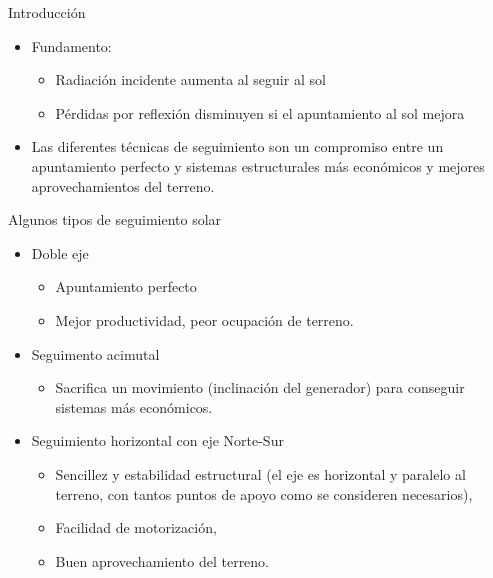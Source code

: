 \documentclass[xcolor={usenames,svgnames,dvipsnames}]{beamer}
\begin{document}
\begin{frame}[label={sec:orged8177a}]{Introducción}
\begin{itemize}[<+->]
\item \alert{Fundamento:}
\begin{itemize}[<.->]
\item Radiación incidente aumenta al seguir al sol

\item Pérdidas por reflexión disminuyen si el apuntamiento al sol mejora
\end{itemize}

\item Las diferentes técnicas de seguimiento son un compromiso entre un
apuntamiento perfecto y sistemas estructurales más económicos y
mejores aprovechamientos del terreno.
\end{itemize}
\end{frame}
\begin{frame}[label={sec:org9499a7a}]{Algunos tipos de seguimiento solar}
\begin{itemize}[<+->]
\item \alert{Doble eje}
\begin{itemize}[<.->]
\item Apuntamiento \guillemotleft{}perfecto\guillemotright{}

\item Mejor productividad, peor ocupación de terreno.
\end{itemize}

\item \alert{Seguimento acimutal}
\begin{itemize}[<.->]
\item Sacrifica un movimiento (inclinación del generador) para conseguir
sistemas más económicos.
\end{itemize}

\item \alert{Seguimiento horizontal con eje Norte-Sur}
\begin{itemize}[<.->]
\item Sencillez y estabilidad estructural (el eje es horizontal y
paralelo al terreno, con tantos puntos de apoyo como se consideren
necesarios),

\item Facilidad de motorización,

\item Buen aprovechamiento del terreno.
\end{itemize}
\end{itemize}
\end{frame}
\end{document}
